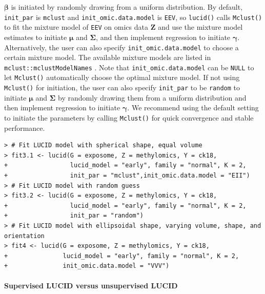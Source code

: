 \(\boldsymbol{\mathbf{\beta}}\) is initiated by randomly drawing from a
uniform distribution. By default, \texttt{init\_par} is \texttt{mclust} and
\texttt{init\_omic.data.model} is \texttt{EEV}, so \texttt{lucid()} calls \texttt{Mclust()} to fit
the mixture model of \texttt{EEV} on omics data \(\boldsymbol{\mathbf{Z}}\) and
use the mixture model estimates to initiate \(\boldsymbol{\mathbf{\mu}}\)
and \(\boldsymbol{\mathbf{\Sigma}}\), and then implement regression to
initiate \(\boldsymbol{\mathbf{\gamma}}\). Alternatively, the user can
also specify \texttt{init\_omic.data.model} to choose a certain mixture model.
The available mixture models are listed in \texttt{mclust::mclustModelNames}
\citep{scrucca2016mclust}. Note that \texttt{init\_omic.data.model} can be \texttt{NULL} to
let \texttt{Mclust()} automatically choose the optimal mixture model. If not
using \texttt{Mclust()} for initiation, the user can also specify \texttt{init\_par} to
be \texttt{random} to initiate \(\boldsymbol{\mathbf{\mu}}\) and
\(\boldsymbol{\mathbf{\Sigma}}\) by randomly drawing them from a uniform
distribution and then implement regression to initiate
\(\boldsymbol{\mathbf{\gamma}}\). We recommend using the default setting
to initiate the parameters by calling \texttt{Mclust()} for quick convergence
and stable performance.

\begin{verbatim}
> # Fit LUCID model with spherical shape, equal volume
> fit3.1 <- lucid(G = exposome, Z = methylomics, Y = ck18, 
+                 lucid_model = "early", family = "normal", K = 2,
+                 init_par = "mclust",init_omic.data.model = "EII")
> # Fit LUCID model with random guess
> fit3.2 <- lucid(G = exposome, Z = methylomics, Y = ck18, 
+                 lucid_model = "early", family = "normal", K = 2,
+                 init_par = "random")
> # Fit LUCID model with ellipsoidal shape, varying volume, shape, and orientation 
> fit4 <- lucid(G = exposome, Z = methylomics, Y = ck18, 
+               lucid_model = "early", family = "normal", K = 2,
+               init_omic.data.model = "VVV")
\end{verbatim}

\paragraph{Supervised LUCID versus unsupervised LUCID}\label{sec3.1.2}

